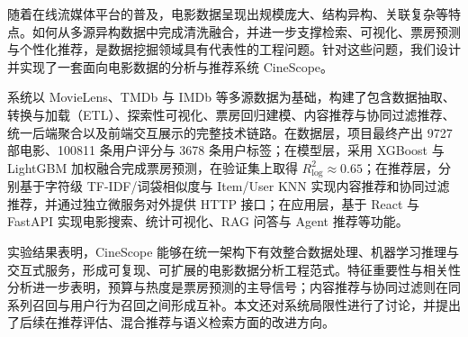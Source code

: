 \begin{cabstract}
  随着在线流媒体平台的普及，电影数据呈现出规模庞大、结构异构、关联复杂等特点。如何从多源异构数据中完成清洗融合，并进一步支撑检索、可视化、票房预测与个性化推荐，是数据挖掘领域具有代表性的工程问题。针对这些问题，我们设计并实现了一套面向电影数据的分析与推荐系统 CineScope。

  系统以 MovieLens、TMDb 与 IMDb 等多源数据为基础，构建了包含数据抽取、转换与加载（ETL）、探索性可视化、票房回归建模、内容推荐与协同过滤推荐、统一后端聚合以及前端交互展示的完整技术链路。在数据层，项目最终产出 9727 部电影、100811 条用户评分与 3678 条用户标签；在模型层，采用 XGBoost 与 LightGBM 加权融合完成票房预测，在验证集上取得 $R^2_{\log} \approx 0.65$；在推荐层，分别基于字符级 TF-IDF/词袋相似度与 Item/User KNN 实现内容推荐和协同过滤推荐，并通过独立微服务对外提供 HTTP 接口；在应用层，基于 React 与 FastAPI 实现电影搜索、统计可视化、RAG 问答与 Agent 推荐等功能。

  实验结果表明，CineScope 能够在统一架构下有效整合数据处理、机器学习推理与交互式服务，形成可复现、可扩展的电影数据分析工程范式。特征重要性与相关性分析进一步表明，预算与热度是票房预测的主导信号；内容推荐与协同过滤则在同系列召回与用户行为召回之间形成互补。本文还对系统局限性进行了讨论，并提出了后续在推荐评估、混合推荐与语义检索方面的改进方向。
\end{cabstract}

